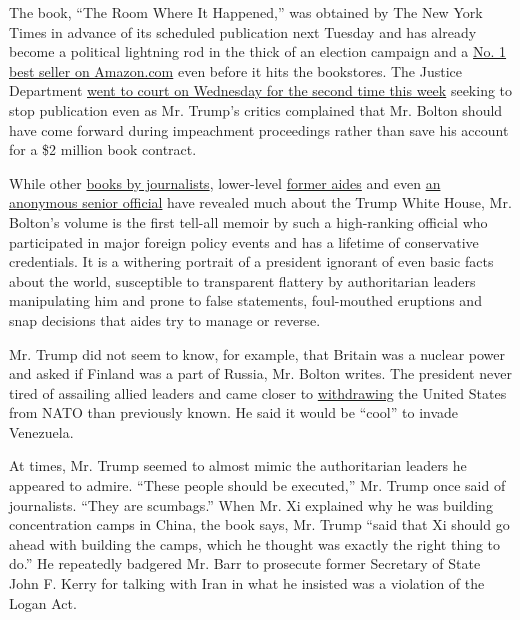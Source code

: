 The book, ``The Room Where It Happened,'' was obtained by The New York
Times in advance of its scheduled publication next Tuesday and has
already become a political lightning rod in the thick of an election
campaign and a
\href{https://www.amazon.com/best-sellers-books-Amazon/zgbs/books/ref=zg_bs_nav_0}{No.
1 best seller on Amazon.com} even before it hits the bookstores. The
Justice Department
\href{https://www.nytimes3xbfgragh.onion/2020/06/17/us/politics/john-bolton-lawsuit.html}{went
to court on Wednesday for the second time this week} seeking to stop
publication even as Mr. Trump's critics complained that Mr. Bolton
should have come forward during impeachment proceedings rather than save
his account for a \$2 million book contract.

While other
\href{https://www.nytimes3xbfgragh.onion/2018/09/05/books/review-fear-trump-in-white-house-bob-woodward.html}{books
by journalists}, lower-level
\href{https://www.nytimes3xbfgragh.onion/2018/08/12/us/politics/omarosa-trump-tape.html}{former
aides} and even
\href{https://www.nytimes3xbfgragh.onion/2019/11/07/books/review/a-warning-anonymous-book-review-trump.html}{an
anonymous senior official} have revealed much about the Trump White
House, Mr. Bolton's volume is the first tell-all memoir by such a
high-ranking official who participated in major foreign policy events
and has a lifetime of conservative credentials. It is a withering
portrait of a president ignorant of even basic facts about the world,
susceptible to transparent flattery by authoritarian leaders
manipulating him and prone to false statements, foul-mouthed eruptions
and snap decisions that aides try to manage or reverse.

Mr. Trump did not seem to know, for example, that Britain was a nuclear
power and asked if Finland was a part of Russia, Mr. Bolton writes. The
president never tired of assailing allied leaders and came closer to
\href{https://www.nytimes3xbfgragh.onion/2019/01/14/us/politics/nato-president-trump.html}{withdrawing}
the United States from NATO than previously known. He said it would be
``cool'' to invade Venezuela.

At times, Mr. Trump seemed to almost mimic the authoritarian leaders he
appeared to admire. ``These people should be executed,'' Mr. Trump once
said of journalists. ``They are scumbags.'' When Mr. Xi explained why he
was building concentration camps in China, the book says, Mr. Trump
``said that Xi should go ahead with building the camps, which he thought
was exactly the right thing to do.'' He repeatedly badgered Mr. Barr to
prosecute former Secretary of State John F. Kerry for talking with Iran
in what he insisted was a violation of the Logan Act.

